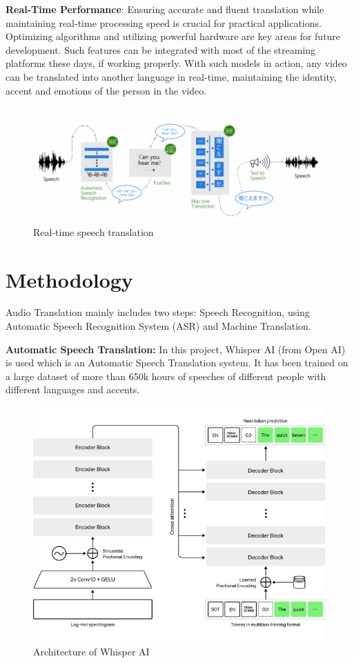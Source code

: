 \documentclass[12px, a4paper]{article}
\begin{document}
\textbf{Real-Time Performance}: Ensuring accurate and fluent translation while maintaining real-time processing speed is crucial for practical applications. Optimizing algorithms and utilizing powerful hardware are key areas for future development. Such features can be integrated with most of the streaming platforms these days, if working properly. With such models in action, any video can be translated into another language in real-time, maintaining the identity, accent and emotions of the person in the video.

\begin{figure}[!htb]
    \includegraphics[width=\textwidth]{audiotrans.png}
    \caption{Real-time speech translation}
\end{figure}

\newpage
\section{Methodology}
Audio Translation mainly includes two steps: Speech Recognition, using Automatic Speech Recognition System (ASR) and Machine Translation.

\textbf{Automatic Speech Translation:} In this project, Whisper AI (from Open AI) is used which is an Automatic Speech Translation system. It has been trained on a large dataset of more than 650k hours of speeches of different people with different languages and accents.

\begin{figure}[!htb]
    \includegraphics[width=\textwidth]{whisper1.png}
    \caption{Architecture of Whisper AI}
\end{figure}
\end{document}
